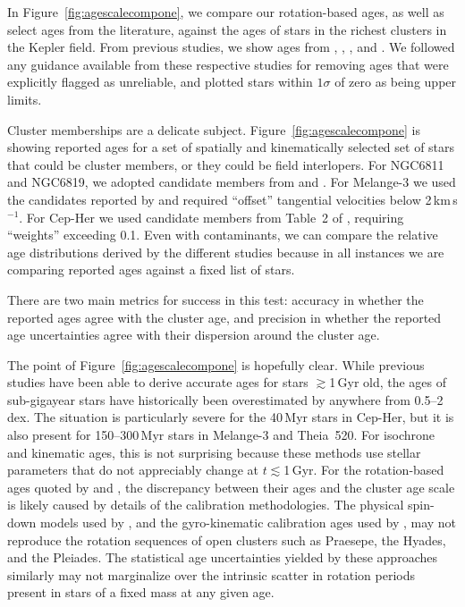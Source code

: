 \documentclass[11pt,twocolumn,tighten]{aastex63}
\newcommand{\kms}{{km\,s$^{-1}$}}
\begin{document}
In Figure~\ref{fig:agescalecompone}, we compare our rotation-based
ages, as well as select ages from the literature, against the ages of stars in the richest
clusters in the Kepler field.
From previous studies, we show ages from \citet{Berger_2020a_catalog},
\citet{2021AJ....161..189L}, \citet{2023ApJ...952..131M}, and
\citet{2024AJ....167..159L}.
We followed any guidance available from these respective studies for
removing ages that were explicitly flagged as unreliable, and plotted
stars within $1\sigma$ of zero as being upper limits.

Cluster memberships are a delicate subject.
Figure~\ref{fig:agescalecompone} is showing reported ages for
a set of spatially and kinematically selected set of stars that could be cluster members, or
they could be field interlopers.  For NGC6811 and NGC6819, we
adopted candidate members from
\citet{2018A&A...618A..93C,CantatGaudin_2020} and
\citet{Kounkel_2020}. 
For Melange-3 we used the candidates reported by
\citet{Barber_2022} and required ``offset'' tangential
velocities below 2\,\kms.  For Cep-Her we
used candidate members from Table~2 of \citet{Bouma_2022b}, requiring
``weights'' exceeding 0.1.
Even with contaminants, we can compare
the relative age distributions derived by the different studies because in all
instances we are comparing reported ages against a fixed list of stars.

There are two main metrics for success in this test: accuracy
in whether the reported ages agree with the cluster age, and precision in
whether the reported age uncertainties agree with their
dispersion around the cluster age.

The point of Figure~\ref{fig:agescalecompone} is hopefully clear.
While previous studies have been able to derive accurate ages for
stars $\gtrsim$1\,Gyr old, the ages of sub-gigayear stars have historically been
overestimated by anywhere from 0.5--2\,dex.
The situation is particularly severe for the 40\,Myr stars in Cep-Her,
but it is also present for 150--300\,Myr stars in Melange-3 and Theia~520.
For isochrone and kinematic ages,
this is not surprising because these methods use stellar parameters that do
not appreciably change at $t$$\lesssim$1\,Gyr.
For the rotation-based ages quoted by
\citet{2023ApJ...952..131M} and \citet{2024AJ....167..159L}, the discrepancy
between their ages and the cluster age scale is likely caused by details of the calibration 
methodologies.
The physical spin-down models used by
\citet{2023ApJ...952..131M},
and the gyro-kinematic calibration ages used by \citet{2024AJ....167..159L},
may not reproduce
the rotation sequences of open clusters such as Praesepe, the Hyades, and the Pleiades.
The statistical age uncertainties yielded by these approaches
similarly may not marginalize over the intrinsic
scatter in rotation periods present in stars of a fixed mass at any given age.
\end{document}
